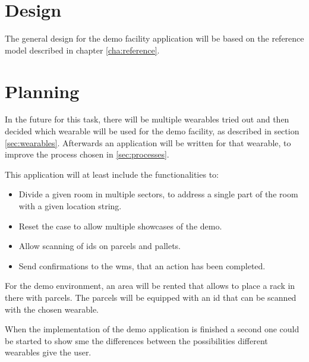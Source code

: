 \section{Design}
The general design for the demo facility application will be based on the reference model described in chapter \ref{cha:reference}. 
\section{Planning}
In the future for this task, there will be multiple wearables tried out and then decided which wearable will be used for the demo facility, as described in section \ref{sec:wearables}. Afterwards an application will be written for that wearable, to improve the process chosen in \ref{sec:processes}. 

This application will at least include the functionalities to:
\begin{itemize}
	\item Divide a given room in multiple sectors, to address a single part of the room with a given location string.
	\item Reset the case to allow multiple showcases of the demo.
	\item Allow scanning of \gls{id}s on \gls{parcel}s and pallets.
	\item Send confirmations to the \gls{wms}, that an action has been completed.
\end{itemize}

For the demo environment, an area will be rented that allows to place a rack in there with \gls{parcel}s. The \gls{parcel}s will be equipped with an \gls{id} that can be scanned with the chosen wearable.

When the implementation of the demo application is finished a second one could be started to show \gls{sme} the differences between the possibilities different wearables give the user.